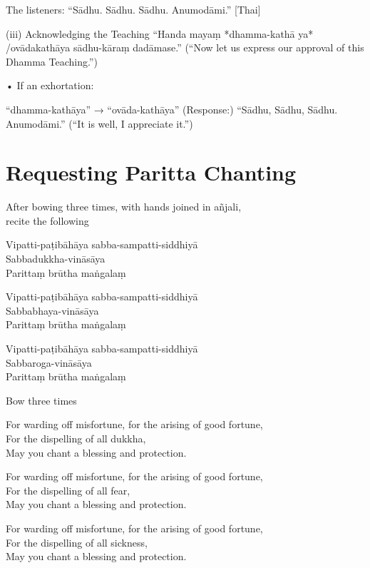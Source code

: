 The listeners:
“Sādhu. Sādhu. Sādhu. Anumodāmi.” [Thai]

(iii) Acknowledging the Teaching
“Handa mayaṃ *dhamma-kathā ya* /ovādakathāya sādhu-kāraṃ dadāmase.”
(“Now let us express our approval
of this Dhamma Teaching.”)

• If an exhortation:

“dhamma-kathāya” → “ovāda-kathāya”
(Response:)
“Sādhu, Sādhu, Sādhu. Anumodāmi.”
(“It is well, I appreciate it.”)

\chapter{Requesting Paritta Chanting}

\begin{instruction}
  After bowing three times, with hands joined in añjali,\\
  recite the following
\end{instruction}

Vipatti-paṭibāhāya sabba-sampatti-siddhiyā\\
Sabbadukkha-vināsāya\\
Parittaṃ brūtha maṅgalaṃ

Vipatti-paṭibāhāya sabba-sampatti-siddhiyā\\
Sabbabhaya-vināsāya\\
Parittaṃ brūtha maṅgalaṃ

Vipatti-paṭibāhāya sabba-sampatti-siddhiyā\\
Sabbaroga-vināsāya\\
Parittaṃ brūtha maṅgalaṃ

\begin{instruction}
  Bow three times
\end{instruction}

\begin{english}
For warding off misfortune, for the arising of good fortune,\\
For the dispelling of all dukkha,\\
May you chant a blessing and protection.

For warding off misfortune, for the arising of good fortune,\\
For the dispelling of all fear,\\
May you chant a blessing and protection.

For warding off misfortune, for the arising of good fortune,\\
For the dispelling of all sickness,\\
May you chant a blessing and protection.
\end{english}

